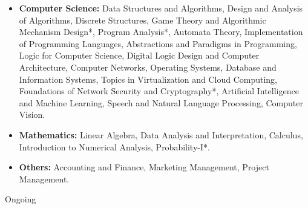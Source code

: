 \begin{itemize}[itemsep = -1.3 mm, leftmargin=*]
% 
\item {\bf Computer Science:} Data Structures and Algorithms, Design 
and Analysis of Algorithms, Discrete Structures, Game Theory and Algorithmic Mechanism Design*, Program Analysis*, Automata Theory, 
Implementation of Programming Languages, Abstractions and Paradigms in 
Programming, Logic for Computer Science, Digital Logic Design and Computer 
Architecture, Computer Networks, Operating Systems, Database and 
Information Systems, Topics in Virtualization and Cloud Computing,
Foundations of Network Security and Cryptography*, Artificial 
Intelligence and Machine Learning, Speech and Natural Language Processing, Computer Vision.
    
    \item {\bf Mathematics:} Linear Algebra, Data Analysis and Interpretation, Calculus, Introduction to Numerical Analysis, Probability-I*.
    \item {\bf Others:} Accounting and Finance, Marketing Management, Project Management.
\end{itemize}
\vspace{-13pt}
\hfill * Ongoing